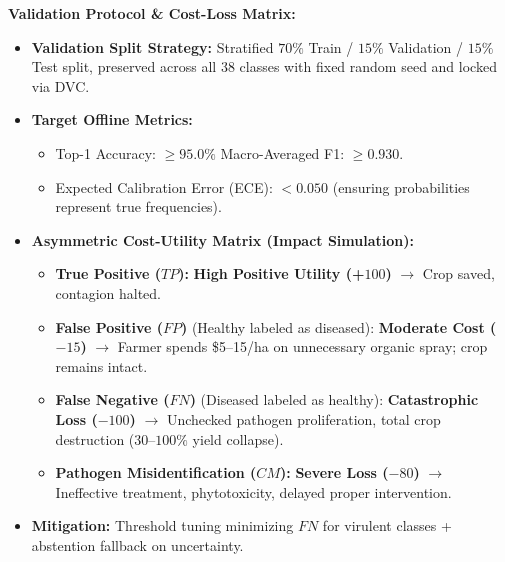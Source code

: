 \documentclass[8pt]{article}
\begin{document}
\begin{minipage}[t]{0.327\linewidth}%
  \begin{tcolorbox}[
    canvasbox,
    colback=bgEval,
    colframe=headEval,
    title={9. OFFLINE EVALUATION \& SIMULATION},
    boxed title style={colback=headEval},
    height=68mm
  ]
  \fontsize{7.2pt}{8.8pt}\selectfont
  \textbf{Validation Protocol \& Cost-Loss Matrix:}
  \vspace{1mm}
  \begin{itemize}
    \item \textbf{Validation Split Strategy:}
      Stratified $70\%$ Train / $15\%$ Validation / $15\%$ Test split, preserved across all 38 classes with fixed random seed and locked via DVC.
    \item \textbf{Target Offline Metrics:}
      \begin{itemize}
        \item Top-1 Accuracy: $\ge 95.0\%$ \quad\textbar\quad Macro-Averaged F1: $\ge 0.930$.
        \item Expected Calibration Error (ECE): $< 0.050$ (ensuring probabilities represent true frequencies).
      \end{itemize}
    \item \textbf{Asymmetric Cost-Utility Matrix (Impact Simulation):}
      \begin{itemize}
        \item \textbf{True Positive ($TP$):} \textcolor{headValue}{\textbf{High Positive Utility (+$100$)}} $\rightarrow$ Crop saved, contagion halted.
        \item \textbf{False Positive ($FP$)} (Healthy labeled as diseased): \textcolor{headDecision}{\textbf{Moderate Cost ($-15$)}} $\rightarrow$ Farmer spends \$5--15/ha on unnecessary organic spray; crop remains intact.
        \item \textbf{False Negative ($FN$)} (Diseased labeled as healthy): \textcolor{headEval}{\textbf{Catastrophic Loss ($-100$)}} $\rightarrow$ Unchecked pathogen proliferation, total crop destruction ($30$--$100\%$ yield collapse).
        \item \textbf{Pathogen Misidentification ($CM$):} \textcolor{headEval}{\textbf{Severe Loss ($-80$)}} $\rightarrow$ Ineffective treatment, phytotoxicity, delayed proper intervention.
      \end{itemize}
    \item \textbf{Mitigation:} Threshold tuning minimizing $FN$ for virulent classes + abstention fallback on uncertainty.
  \end{itemize}
  \end{tcolorbox}%
\end{minipage}%
\end{document}
